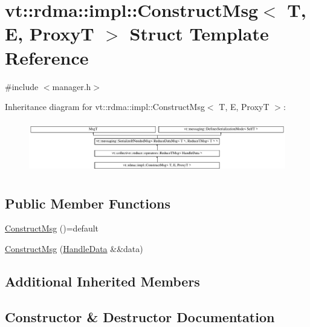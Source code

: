 \hypertarget{structvt_1_1rdma_1_1impl_1_1_construct_msg}{}\section{vt\+:\+:rdma\+:\+:impl\+:\+:Construct\+Msg$<$ T, E, ProxyT $>$ Struct Template Reference}
\label{structvt_1_1rdma_1_1impl_1_1_construct_msg}


{\ttfamily \#include $<$manager.\+h$>$}

Inheritance diagram for vt\+:\+:rdma\+:\+:impl\+:\+:Construct\+Msg$<$ T, E, ProxyT $>$\+:\begin{figure}[H]
\begin{center}
\leavevmode
\includegraphics[height=2.299795cm]{structvt_1_1rdma_1_1impl_1_1_construct_msg}
\end{center}
\end{figure}
\subsection*{Public Member Functions}
\begin{DoxyCompactItemize}
\item 
\hyperlink{structvt_1_1rdma_1_1impl_1_1_construct_msg_a3189d5abbc7385a586cab39d291370a6}{Construct\+Msg} ()=default
\item 
\hyperlink{structvt_1_1rdma_1_1impl_1_1_construct_msg_ad09c61f7e1cb33be9631a2e4885f9cfa}{Construct\+Msg} (\hyperlink{structvt_1_1rdma_1_1impl_1_1_handle_data}{Handle\+Data} \&\&data)
\end{DoxyCompactItemize}
\subsection*{Additional Inherited Members}


\subsection{Constructor \& Destructor Documentation}
\mbox{\label{structvt_1_1rdma_1_1impl_1_1_construct_msg_a3189d5abbc7385a586cab39d291370a6}} 
